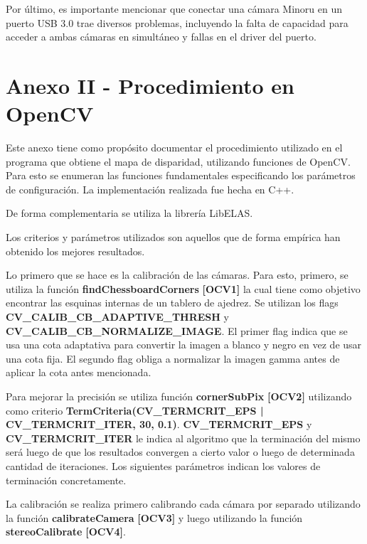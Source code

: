 \documentclass[11pt,a4paper,titlepage]{article}
\begin{document}
Por último, es importante mencionar que conectar una cámara Minoru en un puerto USB 3.0 trae diversos problemas, incluyendo la falta de capacidad para acceder a ambas cámaras en simultáneo y fallas en el driver del puerto.

\newpage

\section{Anexo II - Procedimiento en OpenCV}

Este anexo tiene como propósito documentar el procedimiento utilizado en el programa que obtiene el mapa de disparidad, utilizando funciones de OpenCV. Para esto se enumeran las funciones fundamentales especificando los parámetros de configuración. La implementación realizada fue hecha en C++.

De forma complementaria se utiliza la librería LibELAS.

Los criterios y parámetros utilizados son aquellos que de forma empírica han obtenido los mejores resultados.

Lo primero que se hace es la calibración de las cámaras. Para esto, primero, se utiliza la función \textbf{findChessboardCorners} \textbf{[OCV1]} la cual tiene como objetivo encontrar las esquinas internas de un tablero de ajedrez. Se utilizan los flags \textbf{CV\_CALIB\_CB\_ADAPTIVE\_THRESH} y \textbf{CV\_CALIB\_CB\_NORMALIZE\_IMAGE}. El primer flag indica que se usa una cota adaptativa para convertir la imagen a blanco y negro en vez de usar una cota fija. El segundo flag obliga a normalizar la imagen gamma antes de aplicar la cota antes mencionada.

\begin{sloppypar}
Para mejorar la precisión se utiliza función \textbf{cornerSubPix} \textbf{[OCV2]} utilizando como criterio \textbf{TermCriteria(CV\_TERMCRIT\_EPS | CV\_TERMCRIT\_ITER, 30, 0.1)}.
\textbf{CV\_TERMCRIT\_EPS} y \textbf{CV\_TERMCRIT\_ITER} le indica al algoritmo que la terminación del mismo será luego de que los resultados convergen a cierto valor o luego de determinada cantidad de iteraciones. Los siguientes parámetros indican los valores de terminación concretamente.
\end{sloppypar}

La calibración se realiza primero calibrando cada cámara por separado utilizando la función \textbf{calibrateCamera} \textbf{[OCV3]} y luego utilizando la función \textbf{stereoCalibrate} \textbf{[OCV4]}.
\end{document}
